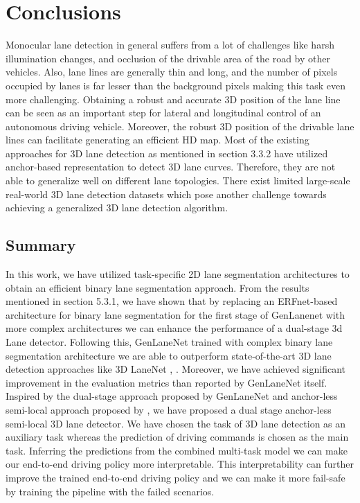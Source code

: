 



    \chapter{Conclusions}
    Monocular lane detection in general suffers from a lot of challenges like harsh illumination changes, and occlusion of the drivable area of the road by other vehicles. Also, lane lines are generally thin and long, and the number of pixels occupied by lanes is far lesser than the background pixels making this task even more challenging. Obtaining a robust and accurate 3D position of the lane line can be seen as an important step for lateral and longitudinal control of an autonomous driving vehicle. Moreover, the robust 3D position of the drivable lane lines can facilitate generating an efficient HD map. Most of the existing approaches for 3D lane detection as mentioned in section 3.3.2 have utilized anchor-based representation to detect 3D lane curves. Therefore, they are not able to generalize well on different lane topologies. There exist limited large-scale real-world 3D lane detection datasets which pose another challenge towards achieving a generalized 3D lane detection algorithm.
     
    

    \section{Summary}
    In this work, we have utilized task-specific 2D lane segmentation architectures to obtain an efficient binary lane segmentation approach.
    From the results mentioned in section 5.3.1, we have shown that by replacing an ERFnet-based \cite{Romera2018ERFNetER}  architecture for binary lane segmentation for the first stage of GenLanenet \cite{guo2020gen} with more complex architectures we can enhance the performance of a dual-stage 3d Lane detector. Following this, GenLaneNet \cite{guo2020gen} trained with complex binary lane segmentation architecture we are able to outperform state-of-the-art 3D lane detection approaches like 3D LaneNet \cite{DBLP:journals/corr/abs-1811-10203}, \cite{9506296}. Moreover, we have achieved significant improvement in the evaluation metrics than reported by GenLaneNet \cite{guo2020gen} itself. Inspired by the dual-stage approach proposed by GenLaneNet \cite{guo2020gen}
    and anchor-less semi-local approach proposed by \cite{DBLP:journals/corr/abs-2011-01535}, we have proposed a dual stage anchor-less semi-local 3D lane detector. We have chosen the task of 3D lane detection as an auxiliary task whereas the prediction of driving commands is chosen as the main task. Inferring the predictions from the combined multi-task model we can make our end-to-end driving policy more interpretable. This interpretability can further improve the trained end-to-end driving policy and we can make it more fail-safe by training the pipeline with the failed scenarios.  

